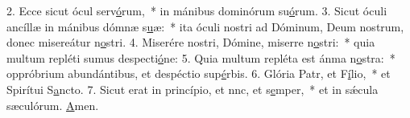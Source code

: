 2. Ecce sicut ócul serv\uline{ó}rum,~* in mánibus dominórum su\uline{ó}rum.
3. Sicut óculi ancíllæ in mánibus dómnæ s\uline{u}æ:~* ita óculi nostri ad Dóminum, Deum nostrum, donec misereátur n\uline{o}stri.
4. Miserére nostri, Dómine, miserre n\uline{o}stri:~* quia multum repléti sumus despecti\uline{ó}ne:
5. Quia multum repléta est ánma n\uline{o}stra:~* oppróbrium abundántibus, et despéctio sup\uline{é}rbis.
6. Glória Patr, et F\uline{í}lio,~* et Spirítui S\uline{a}ncto.
7. Sicut erat in princípio, et nnc, et s\uline{e}mper,~* et in sǽcula sæculórum. \uline{A}men.
